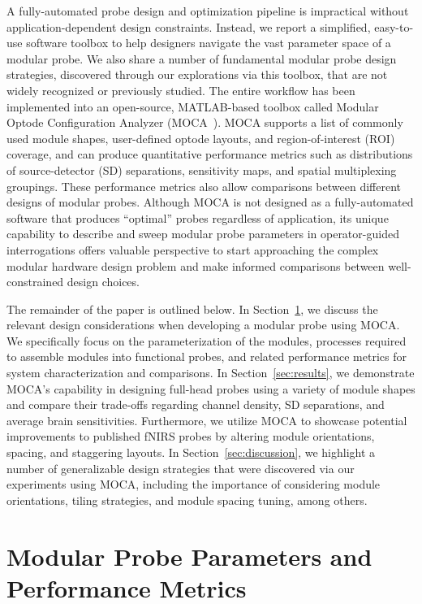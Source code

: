 A fully-automated probe design and optimization pipeline is impractical without application-dependent design constraints. Instead, we report a simplified, easy-to-use software toolbox to help designers navigate the vast parameter space of a modular probe. We also share a number of fundamental modular probe design strategies, discovered through our explorations via this toolbox, that are not widely recognized or previously studied. The entire workflow has been implemented into an open-source, MATLAB-based toolbox called Modular Optode Configuration Analyzer (MOCA~\cite{Vanegas2020}). MOCA supports a list of commonly used module shapes, user-defined optode layouts, and region-of-interest (ROI) coverage, and can produce quantitative performance metrics such as distributions of source-detector (SD) separations, sensitivity maps, and spatial multiplexing groupings. These performance metrics also allow comparisons between different designs of modular probes. Although MOCA is not designed as a fully-automated software that produces ``optimal'' probes regardless of application, its unique capability to describe and sweep modular probe parameters in operator-guided interrogations offers valuable perspective to start approaching the complex modular hardware design problem and make informed comparisons between well-constrained design choices.

The remainder of the paper is outlined below. In Section~\ref{sec:overview}, we discuss the relevant design considerations when developing a modular probe using MOCA. We specifically focus on the parameterization of the modules, processes required to assemble modules into functional probes, and related performance metrics for system characterization and comparisons. In Section~\ref{sec:results}, we demonstrate MOCA's capability in designing full-head probes using a variety of module shapes and compare their trade-offs regarding channel density, SD separations, and average brain sensitivities. Furthermore, we utilize MOCA to showcase potential improvements to published fNIRS probes by altering module orientations, spacing, and staggering layouts. In Section~\ref{sec:discussion}, we highlight a number of generalizable design strategies that were discovered via our experiments using MOCA, including the importance of considering module orientations, tiling strategies, and module spacing tuning, among others.



\section{Modular Probe Parameters and Performance Metrics}
\label{sec:overview}

